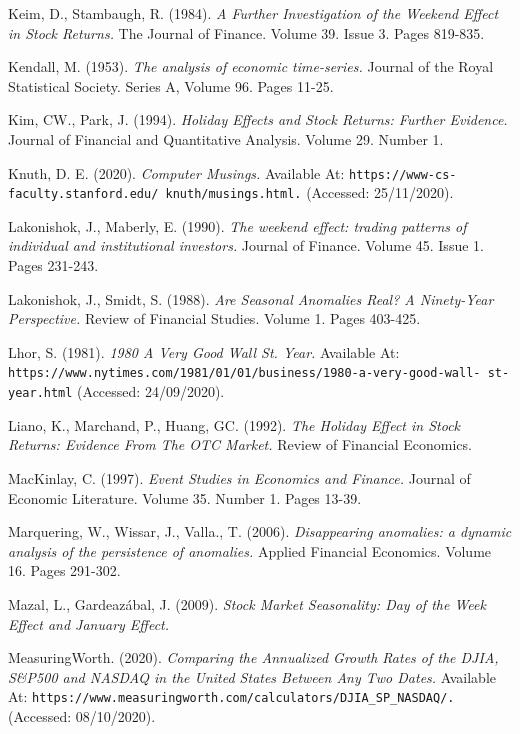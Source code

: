 \documentclass[11pt, english]{article}
\begin{document}
\begin{thebibliography}{9}
		Keim, D., Stambaugh, R. (1984).
		\textsl{A Further Investigation of the Weekend Effect in Stock Returns.}
		The Journal of Finance. Volume 39. Issue 3. Pages 819-835.
	
		Kendall, M. (1953).
		\textsl{The analysis of economic time-series.}
		Journal of the Royal Statistical Society. Series A, Volume 96. Pages 11-25.

		Kim, CW., Park, J. (1994).
		\textsl{Holiday Effects and Stock Returns: Further Evidence.}
		Journal of Financial and Quantitative Analysis. Volume 29. Number 1.

		Knuth, D. E. (2020).
		\textsl{Computer Musings.}
		Available At:
		\texttt{https://www-cs- faculty.stanford.edu/~knuth/musings.html.}
		(Accessed: 25/11/2020).


		Lakonishok, J., Maberly, E. (1990).
		\textsl{The weekend effect: trading patterns of individual and institutional investors.}
		Journal of Finance. Volume 45. Issue 1. Pages 231-243.

		Lakonishok, J., Smidt, S. (1988).
		\textsl{Are Seasonal Anomalies Real? A Ninety-Year Perspective.}
		Review of Financial Studies. Volume 1. Pages 403-425.

		Lhor, S. (1981).
		\textsl{1980 A Very Good Wall St. Year.}
		Available At:
		\texttt{https://www.nytimes.com/1981/01/01/business/1980-a-very-good-wall- st- year.html}
		(Accessed: 24/09/2020).

		Liano, K., Marchand, P., Huang, GC. (1992).
		\textsl{The Holiday Effect in Stock Returns: Evidence From The OTC Market.}
		Review of Financial Economics.


		MacKinlay, C. (1997).
		\textsl{Event Studies in Economics and Finance.}
		Journal of Economic Literature. Volume 35. Number 1. Pages 13-39.

		Marquering, W., Wissar, J., Valla., T. (2006).
		\textsl{Disappearing anomalies: a dynamic analysis of the persistence of anomalies.}
		Applied Financial Economics. Volume 16. Pages 291-302.

		Mazal, L., Gardeazábal, J. (2009).
		\textsl{Stock Market Seasonality: Day of the Week Effect and January Effect.}

		MeasuringWorth. (2020).
		\textsl{Comparing the Annualized Growth Rates of the DJIA, S\&P500 and NASDAQ in the United States Between Any Two Dates.}
		Available At:
		\texttt{https://www.measuringworth.com/calculators/DJIA\_SP\_NASDAQ/.}
		(Accessed: 08/10/2020).


\end{thebibliography}
\end{document}
